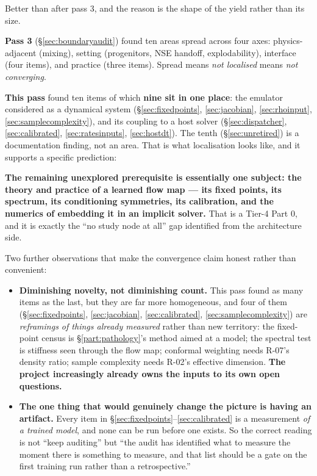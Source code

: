 Better than after pass 3, and the reason is the shape of the yield rather than
its size.

\textbf{Pass 3} (\S\ref{sec:boundaryaudit}) found ten areas spread across four
axes: physics-adjacent (mixing), setting (progenitors, NSE handoff,
explodability), interface (four items), and practice (three items). Spread
means \emph{not localised} means \emph{not converging}.

\textbf{This pass} found ten items of which \textbf{nine sit in one place}: the
emulator considered as a dynamical system (\S\ref{sec:fixedpoints},
\ref{sec:jacobian}, \ref{sec:rhoinput}, \ref{sec:samplecomplexity}), and its
coupling to a host solver (\S\ref{sec:dispatcher}, \ref{sec:calibrated},
\ref{sec:ratesinputs}, \ref{sec:hostdt}). The tenth (\S\ref{sec:unretired}) is
a documentation finding, not an area. That is what localisation looks like, and
it supports a specific prediction:

\begin{result}
\textbf{The remaining unexplored prerequisite is essentially one subject: the
theory and practice of a learned flow map --- its fixed points, its spectrum,
its conditioning symmetries, its calibration, and the numerics of embedding it
in an implicit solver.} That is a Tier-4 Part 0, and it is exactly the ``no
study node at all'' gap  identified from the architecture
side.
\end{result}

Two further observations that make the convergence claim honest rather than
convenient:

\begin{itemize}
\item \textbf{Diminishing novelty, not diminishing count.} This pass found as
  many items as the last, but they are far more homogeneous, and four of them
  (\S\ref{sec:fixedpoints}, \ref{sec:jacobian}, \ref{sec:calibrated},
  \ref{sec:samplecomplexity}) are \emph{reframings of things already measured}
  rather than new territory: the fixed-point census is \S\ref{part:pathology}'s
  method aimed at a model; the spectral test is stiffness seen through the flow
  map; conformal weighting needs R-07's density ratio; sample complexity needs
  R-02's effective dimension. \textbf{The project increasingly already owns the
  inputs to its own open questions.}
\item \textbf{The one thing that would genuinely change the picture is having
  an artifact.} Every item in \S\ref{sec:fixedpoints}--\ref{sec:calibrated} is
  a measurement \emph{of a trained model}, and none can be run before one
  exists. So the correct reading is not ``keep auditing'' but ``the audit has
  identified what to measure the moment there is something to measure, and that
  list should be a gate on the first training run rather than a
  retrospective.''
\end{itemize}

